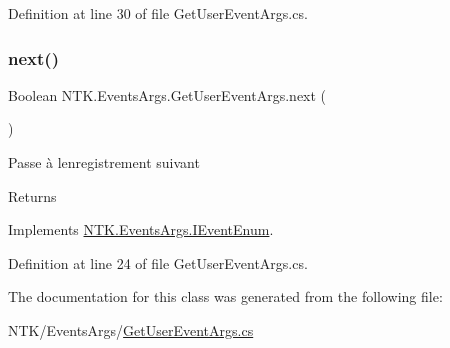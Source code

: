Definition at line 30 of file Get\+User\+Event\+Args.\+cs.

\mbox{\label{class_n_t_k_1_1_events_args_1_1_get_user_event_args_aa281ec855499c199f6f1978e038a6134}} 
\subsubsection{\texorpdfstring{next()}{next()}}
{\footnotesize\ttfamily Boolean N\+T\+K.\+Events\+Args.\+Get\+User\+Event\+Args.\+next (\begin{DoxyParamCaption}{ }\end{DoxyParamCaption})}



Passe à l\textquotesingle{}enregistrement suivant 

\begin{DoxyReturn}{Returns}

\end{DoxyReturn}


Implements \mbox{\hyperlink{interface_n_t_k_1_1_events_args_1_1_i_event_enum_a2b8c40d6d7e9899659aa5a469da93586}{N\+T\+K.\+Events\+Args.\+I\+Event\+Enum}}.



Definition at line 24 of file Get\+User\+Event\+Args.\+cs.



The documentation for this class was generated from the following file\+:\begin{DoxyCompactItemize}
\item 
N\+T\+K/\+Events\+Args/\mbox{\hyperlink{_get_user_event_args_8cs}{Get\+User\+Event\+Args.\+cs}}\end{DoxyCompactItemize}
